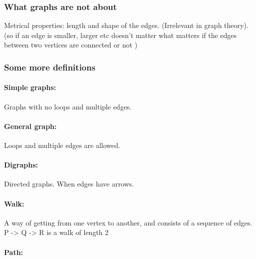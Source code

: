\hypertarget{what-graphs-are-not-about}{%
\subsubsection{What graphs are not
about}\label{what-graphs-are-not-about}}

Metrical properties: length and shape of the edges. (Irrelevant in graph
theory). (so if an edge is smaller, larger etc doesn't matter what
matters if the edges between two vertices are connected or not )

\hypertarget{some-more-definitions}{%
\subsubsection{Some more definitions}\label{some-more-definitions}}

\hypertarget{simple-graphs}{%
\paragraph{Simple graphs:}\label{simple-graphs}}

Graphs with no loops and multiple edges.

\hypertarget{general-graph}{%
\paragraph{General graph:}\label{general-graph}}

Loops and multiple edges are allowed.

\hypertarget{digraphs}{%
\paragraph{Digraphs:}\label{digraphs}}

Directed graphs. When edges have arrows.

\hypertarget{walk}{%
\paragraph{Walk:}\label{walk}}

A way of getting from one vertex to another, and consists of a sequence
of edges. P -\textgreater{} Q -\textgreater{} R is a walk of length 2

\hypertarget{path}{%
\paragraph{Path:}\label{path}}


